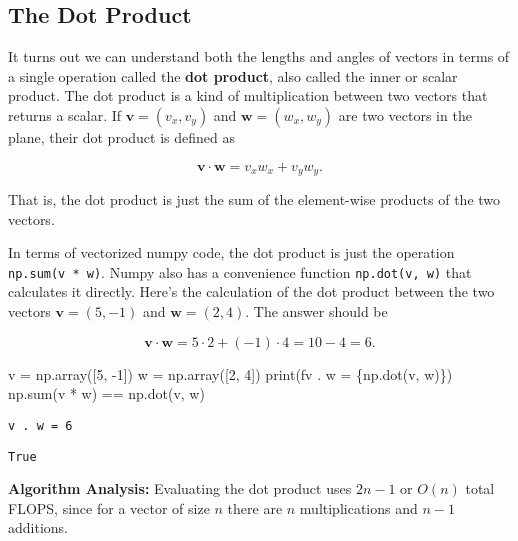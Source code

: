 \documentclass[
  letterpaper,
  DIV=11,
  numbers=noendperiod]{scrreprt}
\newenvironment{Shaded}{\begin{snugshade}}{\end{snugshade}}
\newcommand{\BuiltInTok}[1]{\textcolor[rgb]{0.00,0.23,0.31}{#1}}
\newcommand{\DecValTok}[1]{\textcolor[rgb]{0.68,0.00,0.00}{#1}}
\newcommand{\NormalTok}[1]{\textcolor[rgb]{0.00,0.23,0.31}{#1}}
\newcommand{\OperatorTok}[1]{\textcolor[rgb]{0.37,0.37,0.37}{#1}}
\newcommand{\SpecialCharTok}[1]{\textcolor[rgb]{0.37,0.37,0.37}{#1}}
\newcommand{\SpecialStringTok}[1]{\textcolor[rgb]{0.13,0.47,0.30}{#1}}
\begin{document}
\hypertarget{the-dot-product}{%
\subsection{The Dot Product}\label{the-dot-product}}

It turns out we can understand both the lengths and angles of vectors in
terms of a single operation called the \textbf{dot product}, also called
the inner or scalar product. The dot product is a kind of multiplication
between two vectors that returns a scalar. If \(\mathbf{v}=(v_x,v_y)\)
and \(\mathbf{w}=(w_x,w_y)\) are two vectors in the plane, their dot
product is defined as

\[\mathbf{v} \cdot \mathbf{w} = v_x w_x + v_y w_y.\]

That is, the dot product is just the sum of the element-wise products of
the two vectors.

In terms of vectorized numpy code, the dot product is just the operation
\texttt{np.sum(v\ *\ w)}. Numpy also has a convenience function
\texttt{np.dot(v,\ w)} that calculates it directly. Here's the
calculation of the dot product between the two vectors
\(\mathbf{v}=(5,-1)\) and \(\mathbf{w}=(2,4)\). The answer should be

\[\mathbf{v} \cdot \mathbf{w} = 5 \cdot 2 + (-1) \cdot 4 = 10 - 4 = 6.\]

\begin{Shaded}
\begin{Highlighting}[]
\NormalTok{v }\OperatorTok{=}\NormalTok{ np.array([}\DecValTok{5}\NormalTok{, }\OperatorTok{{-}}\DecValTok{1}\NormalTok{])}
\NormalTok{w }\OperatorTok{=}\NormalTok{ np.array([}\DecValTok{2}\NormalTok{, }\DecValTok{4}\NormalTok{])}
\BuiltInTok{print}\NormalTok{(}\SpecialStringTok{f\textquotesingle{}v . w = }\SpecialCharTok{\{}\NormalTok{np}\SpecialCharTok{.}\NormalTok{dot(v, w)}\SpecialCharTok{\}}\SpecialStringTok{\textquotesingle{}}\NormalTok{)}
\NormalTok{np.}\BuiltInTok{sum}\NormalTok{(v }\OperatorTok{*}\NormalTok{ w) }\OperatorTok{==}\NormalTok{ np.dot(v, w)}
\end{Highlighting}
\end{Shaded}

\begin{verbatim}
v . w = 6
\end{verbatim}

\begin{verbatim}
True
\end{verbatim}

\textbf{Algorithm Analysis:} Evaluating the dot product uses \(2n-1\) or
\(O(n)\) total FLOPS, since for a vector of size \(n\) there are \(n\)
multiplications and \(n-1\) additions.
\end{document}
